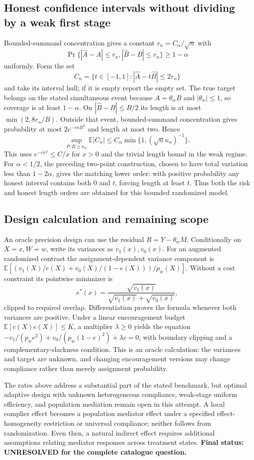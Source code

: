 \documentclass[11pt]{article}
\newcommand{\E}{\mathbb E}
\begin{document}
\subsection*{Honest confidence intervals without dividing by a weak first stage}
Bounded-summand concentration gives a constant
$r_n=C_\alpha/\sqrt n$ with
\[
 \Pr\{ |\widehat A-A|\leq r_n,
          |\widehat B-B|\leq r_n\}\geq1-\alpha
\]
uniformly. Form the set
\[
 C_n=\{t\in[-1,1]:|\widehat A-t\widehat B|\leq2r_n\}
\]
and take its interval hull; if it is empty report the empty set.
The true target belongs on the stated simultaneous event because
$A=\theta_wB$ and $|\theta_w|\leq1$, so coverage is at least $1-\alpha$.
On $|\widehat B-B|\leq B/2$ its length is at most
$\min(2,8r_n/B)$. Outside that event, bounded-summand concentration gives
probability at most $2e^{-cnB^2}$ and length at most two. Hence
\[
 \sup_{P:B\geq\kappa_n}\E|C_n|
 \leq C_\alpha\min\{1,(\sqrt n\kappa_n)^{-1}\}.
\]
This uses $e^{-cx^2}\leq C/x$ for $x>0$ and the trivial length bound in
the weak regime. For $\alpha<1/2$, the preceding two-point construction,
chosen to have total variation less than $1-2\alpha$, gives the matching
lower order: with positive probability any honest interval contains both
0 and $t$, forcing length at least $t$. Thus both the risk and honest
length orders are obtained for this bounded randomized model.

\subsection*{Design calculation and remaining scope}
An oracle precision design can use the residual $R=Y-\theta_wM$.
Conditionally on $X=x,W=w$, write its variances as $v_1(x),v_0(x)$.
For an augmented randomized contrast the assignment-dependent variance
component is
$\E[(v_1(X)/e(X)+v_0(X)/(1-e(X)))/p_w(X)]$. Without a cost constraint its pointwise minimizer is
\[
 e^*(x)=\frac{\sqrt{v_1(x)}}{\sqrt{v_1(x)}+\sqrt{v_0(x)}},
\]
clipped to required overlap. Differentiation proves the formula whenever
both variances are positive. Under a linear encouragement budget
$\E[c(X)e(X)]\leq K$, a multiplier $\lambda\geq0$ yields the equation
$-v_1/(p_we^2)+v_0/(p_w(1-e)^2)+\lambda c=0$, with boundary clipping and a
complementary-slackness condition. This is an oracle calculation: the
variances and target are unknown, and changing encouragement versions may
change compliance rather than merely assignment probability.

The rates above address a substantial part of the stated benchmark, but
optimal adaptive design with unknown heterogeneous compliance, weak-stage
uniform efficiency, and population mediation remain open in this attempt.
A local complier effect becomes a population mediator effect under a
specified effect-homogeneity restriction or universal compliance; neither
follows from randomization. Even then, a natural indirect effect requires
additional assumptions relating mediator responses across treatment states.
\textbf{Final status: UNRESOLVED for the complete catalogue question.}
\end{document}
